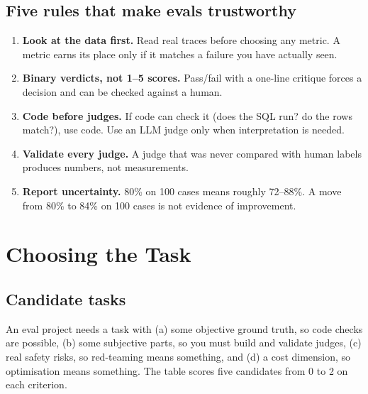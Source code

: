 \documentclass[11pt,a4paper]{article}
\begin{document}
\subsection{Five rules that make evals trustworthy}

\begin{enumerate}
\item \textbf{Look at the data first.} Read real traces before choosing any metric. A metric earns
its place only if it matches a failure you have actually seen.
\item \textbf{Binary verdicts, not 1--5 scores.} Pass/fail with a one-line critique forces a decision
and can be checked against a human.
\item \textbf{Code before judges.} If code can check it (does the SQL run? do the rows match?), use
code. Use an LLM judge only when interpretation is needed.
\item \textbf{Validate every judge.} A judge that was never compared with human labels produces
numbers, not measurements.
\item \textbf{Report uncertainty.} 80\% on 100 cases means roughly 72--88\%. A move from 80\% to
84\% on 100 cases is not evidence of improvement.
\end{enumerate}

\section{Choosing the Task}

\subsection{Candidate tasks}

An eval project needs a task with (a) some objective ground truth, so code checks are possible,
(b) some subjective parts, so you must build and validate judges, (c) real safety risks, so
red-teaming means something, and (d) a cost dimension, so optimisation means something. The
table scores five candidates from 0 to 2 on each criterion.
\end{document}
